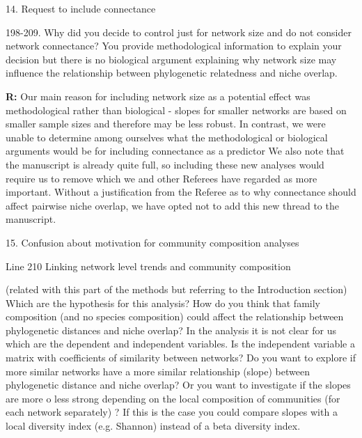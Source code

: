 \documentclass[12pt]{letter}
\newenvironment{refquote}{\bigskip \begin{it}}{\end{it}\smallskip}
\begin{document}
	14. Request to include connectance

		\begin{refquote}
			198-209. Why did you decide to control just for network size and do not consider network connectance? You provide methodological information to explain your decision but there is no biological argument explaining why network size may influence the relationship between phylogenetic relatedness and niche overlap.
		\end{refquote}

		\textbf{R:} Our main reason for including network size as a potential effect was methodological rather than biological - slopes for smaller networks are based on smaller sample sizes and therefore may be less robust. In contrast, we were unable to determine among ourselves what the methodological or biological arguments would be for including connectance as a predictor
		We also note that the manuscript is already quite full, so including these new analyses would require us to remove which we and other Referees have regarded as more important. Without a justification from the Referee as to why connectance should affect pairwise niche overlap, we have opted not to add this new thread to the manuscript.


	15. Confusion about motivation for community composition analyses 

		\begin{refquote}
			Line 210 Linking network level trends and community composition

			(related with this part of the methods but referring to the Introduction section) Which are the hypothesis for this analysis? How do you think that family composition (and no species composition) could affect the relationship between phylogenetic  distances and niche overlap?
			In the analysis it is not clear for us which are the dependent and independent variables. Is the independent variable a matrix with coefficients of similarity between networks?  Do you want to explore if more similar networks have a more similar relationship (slope) between phylogenetic distance and niche overlap? Or you want to investigate if the slopes are more o less strong depending on the local composition of communities (for each network separately) ? If this is the case you could compare slopes with a local diversity index (e.g. Shannon) instead of a beta diversity index.
		\end{refquote}
\end{document}
